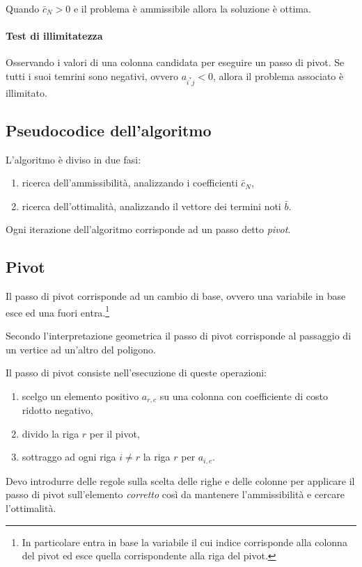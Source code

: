 Quando $\bar{c}_N>0$ e il problema è ammissibile allora la soluzione è ottima.

\paragraph{Test di illimitatezza}
Osservando i valori di una colonna candidata per eseguire un passo di pivot. Se tutti i suoi temrini sono negativi, ovvero $a_{i^*j} < 0$, allora il problema associato è illimitato.

\subsection{Pseudocodice dell'algoritmo}
L'algoritmo è diviso in due fasi:
\begin{enumerate}
 	\item ricerca dell'ammissibilità, analizzando i coefficienti $\bar{c}_N$, 
	\item ricerca dell'ottimalità, analizzando il vettore dei termini noti $\bar{b}$.
\end{enumerate}
	
Ogni iterazione dell'algoritmo corrisponde ad un passo detto \textit{pivot}.

\subsection{Pivot}
Il passo di pivot corrisponde ad un cambio di base, ovvero una variabile in base esce ed una fuori entra.\footnote{In particolare entra in base la variabile il cui indice corrisponde alla colonna del pivot ed esce quella corrispondente alla riga del pivot.} 

Secondo l'interpretazione geometrica il passo di pivot corrisponde al passaggio di un vertice ad un'altro del poligono.

Il passo di pivot consiste nell'esecuzione di queste operazioni:
\begin{enumerate}
	\item scelgo un elemento positivo $a_{r,c}$ su una colonna con coefficiente di costo ridotto negativo, 
	\item divido la riga $r$ per il pivot, 
	\item sottraggo ad ogni riga $i\neq r$ la riga $r$ per $a_{i,c}$.
\end{enumerate}

Devo introdurre delle regole sulla scelta delle righe e delle colonne per applicare il passo di pivot sull'elemento \textit{corretto} così da mantenere l'ammissibilità e cercare l'ottimalità.

